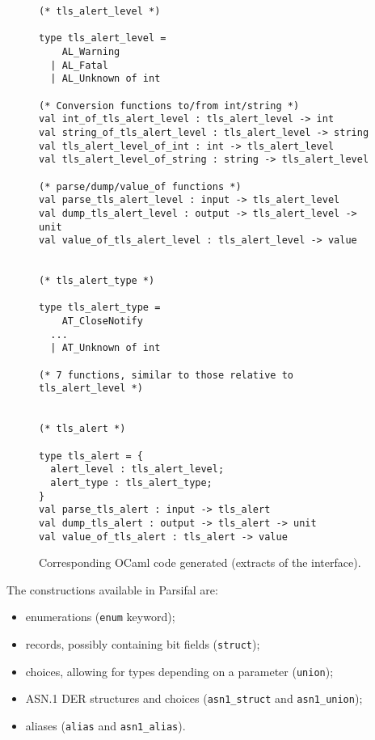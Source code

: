 \documentclass{article}
\begin{document}
\begin{figure}[p]
  \begin{center}\begin{minipage}{.65\linewidth}
    \begin{lstlisting}
(* tls_alert_level *)

type tls_alert_level =
    AL_Warning
  | AL_Fatal
  | AL_Unknown of int

(* Conversion functions to/from int/string *)
val int_of_tls_alert_level : tls_alert_level -> int
val string_of_tls_alert_level : tls_alert_level -> string
val tls_alert_level_of_int : int -> tls_alert_level
val tls_alert_level_of_string : string -> tls_alert_level

(* parse/dump/value_of functions *)
val parse_tls_alert_level : input -> tls_alert_level
val dump_tls_alert_level : output -> tls_alert_level -> unit
val value_of_tls_alert_level : tls_alert_level -> value


(* tls_alert_type *)

type tls_alert_type =
    AT_CloseNotify
  ...
  | AT_Unknown of int

(* 7 functions, similar to those relative to tls_alert_level *)


(* tls_alert *)

type tls_alert = {
  alert_level : tls_alert_level;
  alert_type : tls_alert_type;
}
val parse_tls_alert : input -> tls_alert
val dump_tls_alert : output -> tls_alert -> unit
val value_of_tls_alert : tls_alert -> value
    \end{lstlisting}
  \end{minipage}\end{center}
  \caption{Corresponding OCaml code generated (extracts of the interface).}
  \label{fig:tls-generated-code}
\end{figure}


The constructions available in Parsifal are:
\begin{itemize}
\item enumerations (\texttt{enum} keyword);
\item records, possibly containing bit fields (\texttt{struct});
\item choices, allowing for types depending on a parameter (\texttt{union});
\item ASN.1 DER structures and choices (\texttt{asn1\_struct} and \texttt{asn1\_union});
\item aliases (\texttt{alias} and \texttt{asn1\_alias}).
\end{itemize}
\end{document}
